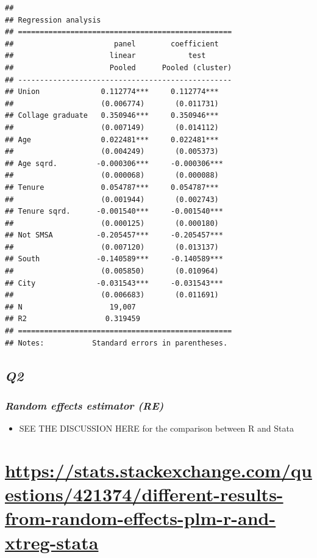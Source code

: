 \documentclass[
]{article}
\providecommand{\tightlist}{%
  \setlength{\itemsep}{0pt}\setlength{\parskip}{0pt}}
\begin{document}
\begin{verbatim}
## 
## Regression analysis
## =================================================
##                       panel        coefficient   
##                      linear            test      
##                      Pooled      Pooled (cluster)
## -------------------------------------------------
## Union              0.112774***     0.112774***   
##                    (0.006774)       (0.011731)   
## Collage graduate   0.350946***     0.350946***   
##                    (0.007149)       (0.014112)   
## Age                0.022481***     0.022481***   
##                    (0.004249)       (0.005373)   
## Age sqrd.         -0.000306***     -0.000306***  
##                    (0.000068)       (0.000088)   
## Tenure             0.054787***     0.054787***   
##                    (0.001944)       (0.002743)   
## Tenure sqrd.      -0.001540***     -0.001540***  
##                    (0.000125)       (0.000180)   
## Not SMSA          -0.205457***     -0.205457***  
##                    (0.007120)       (0.013137)   
## South             -0.140589***     -0.140589***  
##                    (0.005850)       (0.010964)   
## City              -0.031543***     -0.031543***  
##                    (0.006683)       (0.011691)   
## N                    19,007                      
## R2                  0.319459                     
## =================================================
## Notes:           Standard errors in parentheses.
\end{verbatim}

\hypertarget{q2}{%
\subsection{\texorpdfstring{\emph{Q2}}{Q2}}\label{q2}}

\hypertarget{random-effects-estimator-re}{%
\subsubsection{\texorpdfstring{\emph{Random effects estimator
(RE)}}{Random effects estimator (RE)}}\label{random-effects-estimator-re}}

\begin{itemize}
\tightlist
\item
  SEE THE DISCUSSION HERE for the comparison between R and Stata
\end{itemize}

\hypertarget{httpsstats.stackexchange.comquestions421374different-results-from-random-effects-plm-r-and-xtreg-stata}{%
\section{\texorpdfstring{\url{https://stats.stackexchange.com/questions/421374/different-results-from-random-effects-plm-r-and-xtreg-stata}}{https://stats.stackexchange.com/questions/421374/different-results-from-random-effects-plm-r-and-xtreg-stata}}\label{httpsstats.stackexchange.comquestions421374different-results-from-random-effects-plm-r-and-xtreg-stata}}
\end{document}
